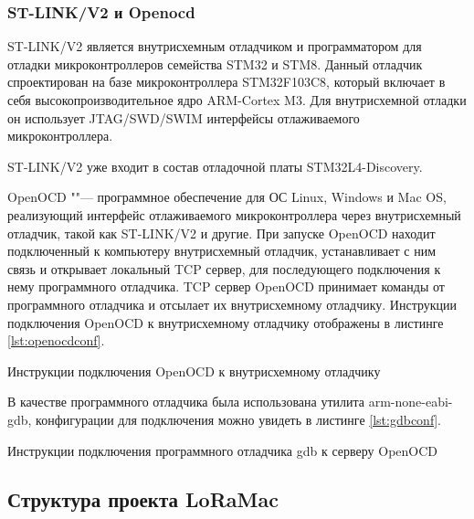 
\subsubsection{ST-LINK/V2 и Openocd}

ST-LINK/V2 является внутрисхемным отладчиком и программатором для отладки 
микроконтроллеров семейства STM32 и STM8.
Данный отладчик спроектирован на базе микроконтроллера STM32F103C8, который 
включает в себя высокопроизводительное ядро ARM-Cortex M3.
Для внутрисхемной отладки он использует JTAG/SWD/SWIM интерфейсы отлаживаемого 
микроконтроллера.

ST-LINK/V2 уже входит в состав отладочной платы STM32L4-Discovery.

OpenOCD ""--- программное обеспечение для ОС Linux, Windows и Mac OS, 
реализующий интерфейс отлаживаемого микроконтроллера через внутрисхемный 
отладчик, такой как ST-LINK/V2 и другие. 
При запуске OpenOCD находит подключенный к компьютеру внутрисхемный отладчик, 
устанавливает с ним связь и открывает локальный TCP сервер, для последующего 
подключения к нему программного отладчика. 
TCP сервер OpenOCD принимает команды от программного отладчика и отсылает их 
внутрисхемному отладчику.
Инструкции подключения OpenOCD к внутрисхемному отладчику отображены в листинге 
\ref{lst:openocdconf}.

\begin{listing}[H]
\caption{Инструкции подключения OpenOCD к внутрисхемному отладчику} 
\label{lst:openocdconf}
\end{listing}

В качестве программного отладчика была использована утилита arm-none-eabi-gdb, 
конфигурации для подключения можно увидеть в листинге \ref{lst:gdbconf}.

\begin{listing}[H]
\caption{Инструкции подключения программного отладчика gdb к серверу OpenOCD} 
\label{lst:gdbconf}
\end{listing}

\subsection{Структура проекта LoRaMac}

